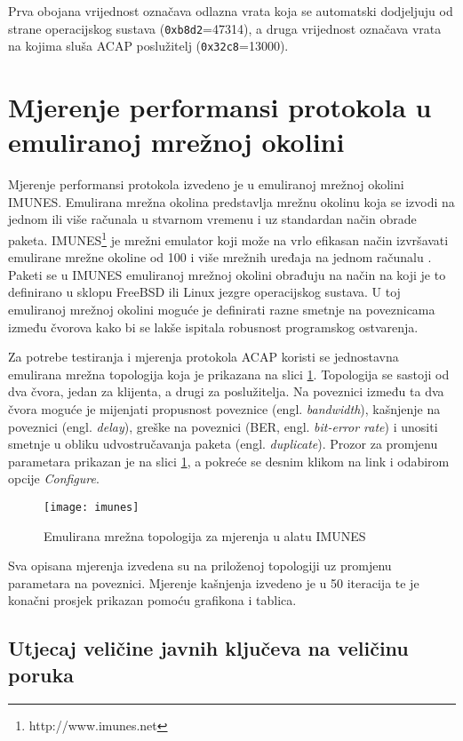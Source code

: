 Prva obojana vrijednost označava odlazna vrata koja se automatski dodjeljuju od
strane operacijskog sustava (\texttt{0xb8d2}=47314), a druga vrijednost označava
vrata na kojima sluša ACAP poslužitelj (\texttt{0x32c8}=13000).

\section{Mjerenje performansi protokola u emuliranoj mrežnoj okolini}

Mjerenje performansi protokola izvedeno je u emuliranoj mrežnoj okolini IMUNES.
Emulirana mrežna okolina predstavlja mrežnu okolinu koja se izvodi na jednom ili
više računala u stvarnom vremenu i uz standardan način obrade paketa.
IMUNES\footnote{http://www.imunes.net} je
mrežni emulator koji može na vrlo efikasan način izvršavati emulirane mrežne
okoline od 100 i više mrežnih uređaja na jednom računalu
\cite{salopek2014network}. Paketi se u
IMUNES emuliranoj mrežnoj okolini obrađuju na način na koji je to definirano u
sklopu FreeBSD ili Linux jezgre operacijskog sustava. U toj emuliranoj
mrežnoj okolini moguće je definirati razne smetnje na poveznicama između čvorova
kako bi se lakše ispitala robusnost programskog ostvarenja.

Za potrebe testiranja i mjerenja protokola ACAP koristi se jednostavna emulirana
mrežna topologija koja je prikazana na slici \ref{fig:imunes}. Topologija se
sastoji od dva čvora, jedan za klijenta, a drugi za poslužitelja. Na
poveznici između ta dva čvora moguće je mijenjati propusnost poveznice (engl.
\emph{bandwidth}),
kašnjenje na poveznici (engl. \emph{delay}), greške na poveznici (BER,
engl. \emph{bit-error rate}) i unositi smetnje u obliku
udvostručavanja paketa (engl. \emph{duplicate}). Prozor za promjenu parametara
prikazan je na slici \ref{fig:imunes}, a pokreće se desnim klikom na link i
odabirom opcije \emph{Configure}.

\begin{figure}[h]
    \centering
    \texttt{[image: imunes]}
    \caption{Emulirana mrežna topologija za mjerenja u alatu IMUNES}
    \label{fig:imunes}
\end{figure}

Sva opisana mjerenja izvedena su na priloženoj topologiji uz promjenu
parametara na poveznici. Mjerenje kašnjenja izvedeno je u 50 iteracija
te je konačni prosjek prikazan pomoću grafikona i tablica.

\subsection{Utjecaj veličine javnih ključeva na veličinu poruka}

